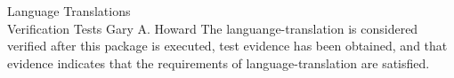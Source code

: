 \documentclass[10pt]{tlc-article}
\begin{document}
  \tlcTitlePageAndTableOfContents
    {Language Translations \\ Verification Tests}%
    {Gary A. Howard}
    {The languange-translation is considered verified after this package is
     executed, test evidence has been obtained, and that evidence indicates
     that the requirements of language-translation are satisfied.}

  
  
\end{document}
